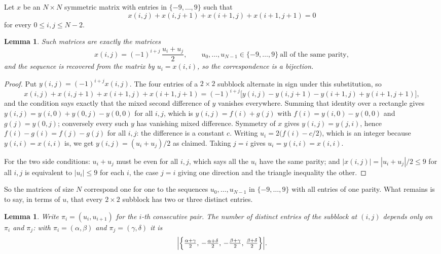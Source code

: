 \documentclass[11pt,a4paper]{article}
\theoremstyle{plain}
\newtheorem{lemma}[theorem]{Lemma}
\theoremstyle{definition}
\begin{document}
Let $x$ be an $N\times N$ symmetric matrix with entries in $\{-9,\dots,9\}$ such that
\[
x(i,j)+x(i,j{+}1)+x(i{+}1,j)+x(i{+}1,j{+}1)=0
\]
for every $0\le i,j\le N-2$.

\begin{lemma}\label{lem:solve}
Such matrices are exactly the matrices
\[
x(i,j)=(-1)^{i+j}\,\frac{u_i+u_j}{2},
\qquad u_0,\dots,u_{N-1}\in\{-9,\dots,9\}\ \text{all of the same parity},
\]
and the sequence is recovered from the matrix by $u_i=x(i,i)$, so the correspondence is a
bijection.
\end{lemma}

\begin{proof}
Put $y(i,j)=(-1)^{i+j}x(i,j)$. The four entries of a $2\times2$ subblock alternate in sign
under this substitution, so
\[
x(i,j)+x(i,j{+}1)+x(i{+}1,j)+x(i{+}1,j{+}1)
=(-1)^{i+j}\bigl[y(i,j)-y(i,j{+}1)-y(i{+}1,j)+y(i{+}1,j{+}1)\bigr],
\]
and the condition says exactly that the mixed second difference of $y$ vanishes everywhere.
Summing that identity over a rectangle gives
$y(i,j)=y(i,0)+y(0,j)-y(0,0)$ for all $i,j$, which is $y(i,j)=f(i)+g(j)$ with
$f(i)=y(i,0)-y(0,0)$ and $g(j)=y(0,j)$; conversely every such $y$ has vanishing mixed
difference. Symmetry of $x$ gives $y(i,j)=y(j,i)$, hence $f(i)-g(i)=f(j)-g(j)$ for all $i,j$:
the difference is a constant $c$. Writing $u_i=2\bigl(f(i)-c/2\bigr)$, which is an integer
because $y(i,i)=x(i,i)$ is, we get $y(i,j)=(u_i+u_j)/2$ as claimed. Taking $j=i$ gives
$u_i=y(i,i)=x(i,i)$.

For the two side conditions: $u_i+u_j$ must be even for all $i,j$, which says all the $u_i$ have
the same parity; and $|x(i,j)|=|u_i+u_j|/2\le9$ for all $i,j$ is equivalent to $|u_i|\le9$
for each $i$, the case $j=i$ giving one direction and the triangle inequality the other.
\end{proof}

So the matrices of size $N$ correspond one for one to the sequences $u_0,\dots,u_{N-1}$ in
$\{-9,\dots,9\}$ with all entries of one parity. What remains is to say, in terms of $u$,
that every $2\times2$ subblock has two or three distinct entries.

\begin{lemma}\label{lem:block}
Write $\pi_i=(u_i,u_{i+1})$ for the $i$-th consecutive pair. The number of distinct entries of
the subblock at $(i,j)$ depends only on $\pi_i$ and $\pi_j$: with $\pi_i=(\alpha,\beta)$ and
$\pi_j=(\gamma,\delta)$ it is
\[
\Bigl|\Bigl\{\tfrac{\alpha+\gamma}{2},\,-\tfrac{\alpha+\delta}{2},\,
-\tfrac{\beta+\gamma}{2},\,\tfrac{\beta+\delta}{2}\Bigr\}\Bigr| .
\]
\end{lemma}
\end{document}
